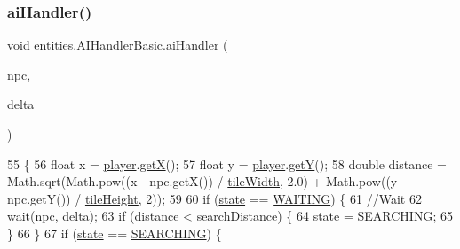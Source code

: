 \subsubsection{\texorpdfstring{ai\+Handler()}{aiHandler()}}
{\footnotesize\ttfamily void entities.\+A\+I\+Handler\+Basic.\+ai\+Handler (\begin{DoxyParamCaption}\item[{\mbox{\hyperlink{classentities_1_1_n_p_c}{N\+PC}}}]{npc,  }\item[{long}]{delta }\end{DoxyParamCaption})\hspace{0.3cm}{\ttfamily [inline]}}


\begin{DoxyCode}
55                                                \{
56         \textcolor{keywordtype}{float} x = \mbox{\hyperlink{classentities_1_1_a_i_handler_basic_ad7c5aba342053f29862df5f38537bf1c}{player}}.\mbox{\hyperlink{classorg_1_1newdawn_1_1slick_1_1geom_1_1_shape_a736a47bfdd6f164558b43fd497a3a3f3}{getX}}();
57         \textcolor{keywordtype}{float} y = \mbox{\hyperlink{classentities_1_1_a_i_handler_basic_ad7c5aba342053f29862df5f38537bf1c}{player}}.\mbox{\hyperlink{classorg_1_1newdawn_1_1slick_1_1geom_1_1_shape_a5f334f962d8fc525d522fe0f8ac20b35}{getY}}();
58         \textcolor{keywordtype}{double} distance = Math.sqrt(Math.pow((x - npc.getX()) / \mbox{\hyperlink{classentities_1_1_a_i_handler_basic_a177ec0f84d2ce15ba89575b5a87cc742}{tileWidth}}, 2.0) + Math.pow((y - 
      npc.getY()) / \mbox{\hyperlink{classentities_1_1_a_i_handler_basic_a9e9f42b3f5f874a95d171885e89c663c}{tileHeight}}, 2));
59 
60         \textcolor{keywordflow}{if} (\mbox{\hyperlink{classentities_1_1_a_i_handler_basic_afe4e5d49bf8c83164a89b0dec990406f}{state}} == \mbox{\hyperlink{classentities_1_1_a_i_handler_basic_a45d0ef8169388da1db65210670398487}{WAITING}}) \{
61             \textcolor{comment}{//Wait}
62             \mbox{\hyperlink{classentities_1_1_a_i_handler_basic_a5e92ef9a2ad97490bf2cb32bf58be950}{wait}}(npc, delta);
63             \textcolor{keywordflow}{if} (distance < \mbox{\hyperlink{classentities_1_1_a_i_handler_basic_acb64b3c7941a4f72fd76262280b3e399}{searchDistance}}) \{
64                 \mbox{\hyperlink{classentities_1_1_a_i_handler_basic_afe4e5d49bf8c83164a89b0dec990406f}{state}} = \mbox{\hyperlink{classentities_1_1_a_i_handler_basic_ac538f98b8bf642899b6cfe493258f381}{SEARCHING}};
65             \}
66         \}
67         \textcolor{keywordflow}{if} (\mbox{\hyperlink{classentities_1_1_a_i_handler_basic_afe4e5d49bf8c83164a89b0dec990406f}{state}} == \mbox{\hyperlink{classentities_1_1_a_i_handler_basic_ac538f98b8bf642899b6cfe493258f381}{SEARCHING}}) \{

\end{DoxyCode}
